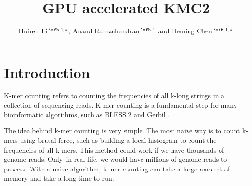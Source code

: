 \documentclass{bioinfo}
\begin{document}

\title[short Title]{GPU accelerated KMC2}
\author[]{Huiren Li\,$^{\text{\sfb 1,}*}$, Anand Ramachandran\,$^{\text{\sfb 1}}$ and Deming Chen\,$^{\text{\sfb 1,}*}$}
\address{$^{\text{\sf 1}}$Department of Electrical and Computer Engineering, University of Illinois at Urbana-Champaign, Urbana, IL 61801, USA}

\corresp{}




\maketitle

\section{Introduction}

K-mer counting refers to counting the frequencies of all  k-long strings in a collection of sequencing reads.
K-mer counting is a fundamental step for many bioinformatic algorithms, such as BLESS 2 \citep{Heo16} and Gerbil \citep{Mar17}.

The idea behind k-mer counting is very simple. The most naive way is to count k-mers using brutal force, such as building a local histogram to count the frequencies of all k-mers.
This method could work if we have thousands of genome reads. Only, in real life, we would have millions of genome reads to process. With a naive algorithm, k-mer counting can take a large amount of memory and take a long time to run. 
\end{document}
